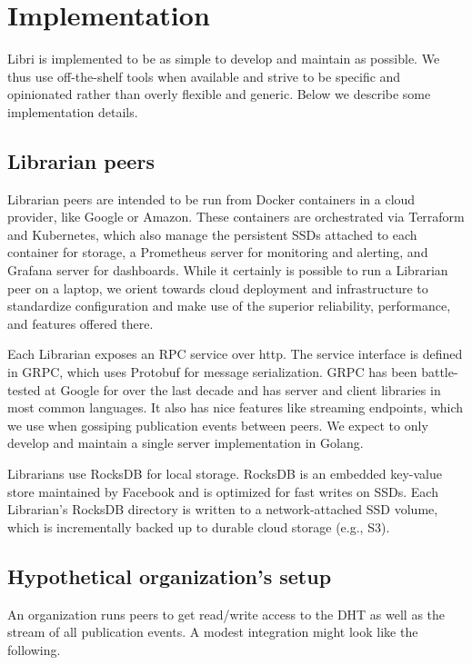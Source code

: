 \documentclass[10pt]{article}
\begin{document}
\section{Implementation}
\label{sec:impl}

Libri is implemented to be as simple to develop and maintain as possible. We thus use off-the-shelf tools when available and strive to be specific and opinionated rather than overly flexible and generic. Below we describe some implementation details. 

\subsection{Librarian peers}
Librarian peers are intended to be run from Docker containers in a cloud provider, like Google or Amazon. These containers are orchestrated via Terraform and Kubernetes, which also manage the persistent SSDs attached to each container for storage, a Prometheus server for monitoring and alerting, and Grafana server for dashboards. While it certainly is possible to run a Librarian peer on a laptop, we orient towards cloud deployment and infrastructure to standardize configuration and make use of the superior reliability, performance, and features offered there. 

Each Librarian exposes an RPC service over http. The service interface is defined in GRPC, which uses Protobuf for message serialization. GRPC has been battle-tested at Google for over the last decade and has server and client libraries in most common languages. It also has nice features like streaming endpoints, which we use when gossiping publication events between peers. We expect to only develop and maintain a single server implementation in Golang. 

Librarians use RocksDB for local storage. RocksDB is an embedded key-value store maintained by Facebook and is optimized for fast writes on SSDs. Each Librarian's RocksDB directory is written to a network-attached SSD volume, which is incrementally backed up to durable cloud storage (e.g., S3). 


\subsection{Hypothetical organization's setup}
An organization runs peers to get read/write access to the DHT as well as the stream of all publication events. A modest integration might look like the following.
\end{document}
